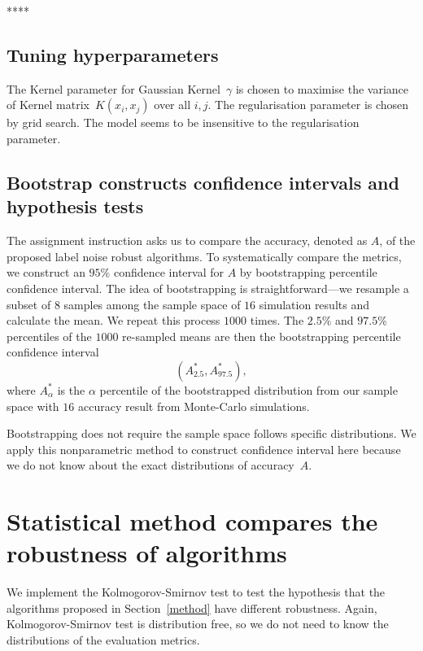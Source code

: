\documentclass[12pt]{article} %
\begin{document}
****
\subsection{Tuning hyperparameters}
The Kernel parameter for Gaussian Kernel~$\gamma$ is chosen to maximise the variance of Kernel matrix~$K(x_i,x_j)$ over all $i,j$. The regularisation parameter is chosen by grid search. The model seems to be insensitive to the regularisation parameter.

\subsection{Bootstrap constructs confidence intervals and hypothesis tests}\label{ci}
The assignment instruction asks us to compare the accuracy, denoted as $A$, of the proposed label noise robust algorithms. To systematically compare the metrics, we construct an $95\%$ confidence interval for $A$ by bootstrapping percentile confidence interval. The idea of bootstrapping  is straightforward---we resample a subset of $8$ samples among the sample space of $16$ simulation results and calculate the mean. We repeat this process $1000$ times. The $2.5\%$ and $97.5\%$ percentiles of the $1000$ re-sampled means are then the bootstrapping percentile confidence interval
\begin{equation}
({A}^*_{2.5}, {A}^*_{97.5}), \label{eq:boot}
\end{equation}
where $A^*_{\alpha}$ is the $\alpha$ percentile of the bootstrapped distribution from our sample space with $16$ accuracy result from Monte-Carlo simulations.

Bootstrapping does not require the sample space follows specific distributions. We apply this nonparametric method to construct confidence interval here because we do not know about the exact distributions of accuracy~$A$.

\section{Statistical method compares the robustness of algorithms}
We implement the Kolmogorov-Smirnov test to test the hypothesis that the algorithms proposed in Section~\ref{method} have different robustness.  Again, Kolmogorov-Smirnov test is distribution free, so we do not need to know the distributions of the evaluation metrics.
\end{document}

